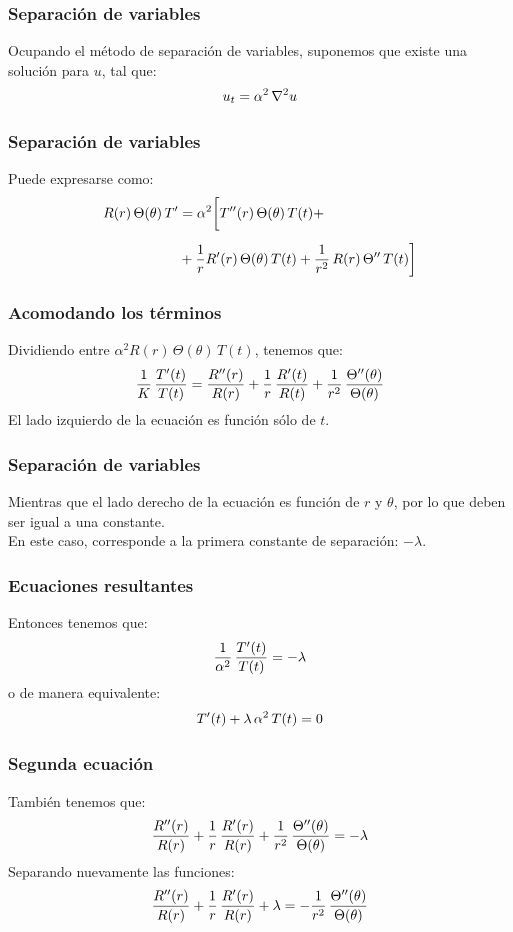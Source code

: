 \documentclass[12pt]{beamer}
\begin{document}
\begin{frame}
\frametitle{Separación de variables}
Ocupando el método de separación de variables, suponemos que existe una solución para $u$, tal que:
\pause
\begin{align*}
u_{t} = \alpha^{2} \, \laplacian{u}
\end{align*}
\end{frame}
\begin{frame}[fragile]
\frametitle{Separación de variables}
Puede expresarse como:
\pause
\begin{align*}
R (r) \, \Theta (\theta) \, {T}^{\prime} &= \alpha^{2} \bigg[ {T}^{\prime \prime} (r) \, \Theta (\theta) \, T (t) + \\[0.5em]
&+ \dfrac{1}{r} {R}^{\prime} (r) \, \Theta(\theta) \, T (t) + \dfrac{1}{r^{2}} \, R (r) \, {\Theta}^{\prime \prime} \, T (t) \bigg]
\end{align*}
\end{frame}
\begin{frame}
\frametitle{Acomodando los términos}
Dividiendo entre $\alpha^{2} R (r) \, \Theta (\theta) \, T (t)$, tenemos que:
\pause
\begin{align}
\dfrac{1}{K} \, \dfrac{{T}^{\prime} (t)}{T (t)} = \dfrac{{R}^{\prime \prime} (r)}{R (r)} + \dfrac{1}{r} \, \dfrac{{R}^{\prime} (t)}{R (t)} + \dfrac{1}{r^{2}} \, \dfrac{{\Theta}^{\prime \prime} (\theta)}{\Theta (\theta)}
\label{eq:ecuacion_K01}
\end{align}
\pause
El lado izquierdo de la ecuación es función sólo de $t$.
\end{frame}
\begin{frame}
\frametitle{Separación de variables}
Mientras que el lado derecho de la ecuación es función de $r$ y $\theta$, por lo que deben ser igual a una constante.
\\
\bigskip
\pause
En este caso, corresponde a la primera constante de separación: $- \lambda$.
\end{frame}
\begin{frame}
\frametitle{Ecuaciones resultantes}
Entonces tenemos que:
\pause
\begin{align*}
\dfrac{1}{\alpha^{2}} \, \dfrac{{T}^{\prime} (t)}{T (t)} = - \lambda
\end{align*}
o de manera equivalente:
\pause
\begin{align}
{T}^{\prime}(t) + \lambda \, \alpha^{2} \, T(t) = 0
\label{eq:ecuacion_K02}    
\end{align}
\end{frame}
\begin{frame}
\frametitle{Segunda ecuación}
También tenemos que:
\pause
\begin{align*}
\dfrac{{R}^{\prime \prime} (r)}{R (r)} + \dfrac{1}{r} \, \dfrac{{R}^{\prime} (r)}{R (r)} + \dfrac{1}{r^{2}} \, \dfrac{{\Theta}^{\prime \prime} (\theta)}{\Theta (\theta)} = - \lambda
\end{align*}
\pause
Separando nuevamente las funciones:
\pause
\begin{align*}
\dfrac{{R}^{\prime \prime} (r)}{R (r)} + \dfrac{1}{r} \, \dfrac{{R}^{\prime} (r)}{R (r)} + \lambda = - \dfrac{1}{r^{2}} \, \dfrac{{\Theta}^{\prime \prime} (\theta)}{\Theta (\theta)}
\end{align*}
\end{frame}
\end{document}
